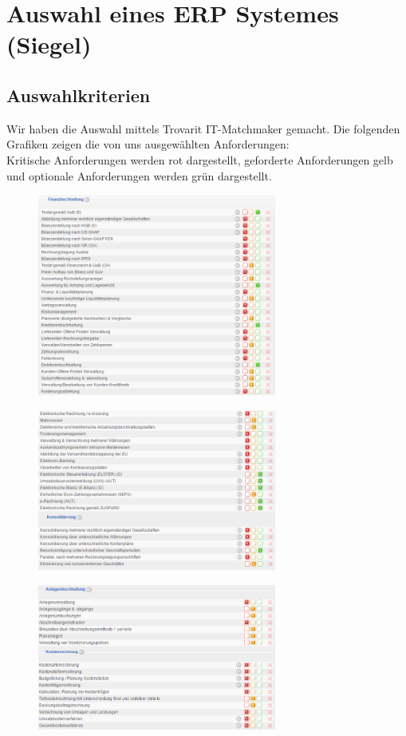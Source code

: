 \documentclass[12pt]{article}
\begin{document}
\section{Auswahl eines ERP Systemes (Siegel)}
\subsection{Auswahlkriterien}
Wir haben die Auswahl mittels Trovarit IT-Matchmaker gemacht. Die folgenden Grafiken zeigen die von uns ausgewählten Anforderungen: \\
Kritische Anforderungen werden rot dargestellt, geforderte Anforderungen gelb und optionale Anforderungen werden grün dargestellt.
\begin{figure}[here!]
\centering
\includegraphics[width=0.7\textwidth]{images/tr1}
\end{figure}\FloatBarrier
\noindent
\begin{figure}[here!]
\centering
\includegraphics[width=0.7\textwidth]{images/tr2}
\end{figure}\FloatBarrier
\noindent
\begin{figure}[here!]
\centering
\includegraphics[width=0.7\textwidth]{images/tr3}
\end{figure}\FloatBarrier
\end{document}

